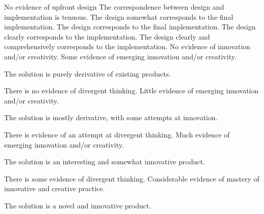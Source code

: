 \documentclass{../../fal_assignment}
\begin{document}
\begin{markingrubric}
%
        \grade\fail No evidence of upfront design
        \grade The correspondence between design and implementation is tenuous.
        \grade The design somewhat corresponds to the final implementation.
        \grade The design corresponds to the final implementation.
        \grade The design clearly corresponds to the implementation.
        \grade The design clearly and comprehensively corresponds to the implementation.
%
        \grade\fail No evidence of innovation and/or creativity.
        \grade Some evidence of emerging innovation and/or creativity.
            \par The solution is purely derivative of existing products.
            \par There is no evidence of divergent thinking.
        \grade Little evidence of emerging innovation and/or creativity.
            \par The solution is mostly derivative, with some attempts at innovation.
            \par There is evidence of an attempt at divergent thinking.
        \grade Much evidence of emerging innovation and/or creativity.
            \par The solution is an interesting and somewhat innovative product.
            \par There is some evidence of divergent thinking.
        \grade Considerable evidence of mastery of innovative and creative practice.
            \par The solution is a novel and innovative product.

\end{markingrubric}
\end{document}
